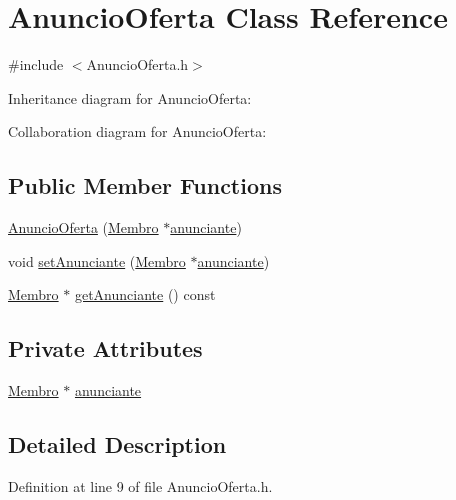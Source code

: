\hypertarget{class_anuncio_oferta}{\section{Anuncio\+Oferta Class Reference}
\label{class_anuncio_oferta}
}


{\ttfamily \#include $<$Anuncio\+Oferta.\+h$>$}



Inheritance diagram for Anuncio\+Oferta\+:


Collaboration diagram for Anuncio\+Oferta\+:
\subsection*{Public Member Functions}
\begin{DoxyCompactItemize}
\item 
\hyperlink{class_anuncio_oferta_a49321070a1da7dfba74e92a4da8a3073}{Anuncio\+Oferta} (\hyperlink{class_membro}{Membro} $\ast$\hyperlink{class_anuncio_oferta_a5de28c6a5a698a5ddabcf258c3c42d3c}{anunciante})
\item 
void \hyperlink{class_anuncio_oferta_a2bb132a1679d5a51edf54ac823bb9c4e}{set\+Anunciante} (\hyperlink{class_membro}{Membro} $\ast$\hyperlink{class_anuncio_oferta_a5de28c6a5a698a5ddabcf258c3c42d3c}{anunciante})
\item 
\hyperlink{class_membro}{Membro} $\ast$ \hyperlink{class_anuncio_oferta_a517173f7de8f7952e402e58b8b5d19b9}{get\+Anunciante} () const 
\end{DoxyCompactItemize}
\subsection*{Private Attributes}
\begin{DoxyCompactItemize}
\item 
\hyperlink{class_membro}{Membro} $\ast$ \hyperlink{class_anuncio_oferta_a5de28c6a5a698a5ddabcf258c3c42d3c}{anunciante}
\end{DoxyCompactItemize}


\subsection{Detailed Description}


Definition at line 9 of file Anuncio\+Oferta.\+h.



